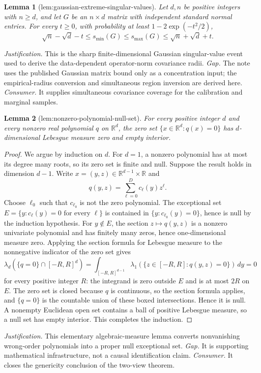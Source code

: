 \documentclass{article}
\newtheorem{lemma}{Lemma}
\begin{document}
\begin{lemma}[lem:gaussian-extreme-singular-values]\label{lem:gaussian-extreme-singular-values}
Let \(d,n\) be positive integers with \(n\ge d\), and let \(G\) be an \(n\times d\) matrix with independent standard normal entries.  For every \(t\ge0\), with probability at least \(1-2\exp(-t^2/2)\),
\[
\sqrt n-\sqrt d-t\le s_{\min}(G)\le s_{\max}(G)\le\sqrt n+\sqrt d+t.
\]
\end{lemma}
\par\smallskip\noindent \textit{Justification.} This is the sharp finite-dimensional Gaussian singular-value event used to derive the data-dependent operator-norm covariance radii. \textit{Gap.} The note uses the published Gaussian matrix bound only as a concentration input; the empirical-radius conversion and simultaneous region inversion are derived here. \textit{Consumer.} It supplies simultaneous covariance coverage for the calibration and marginal samples.

\begin{lemma}[lem:nonzero-polynomial-null-set]\label{lem:nonzero-polynomial-null-set}
For every positive integer \(d\) and every nonzero real polynomial \(q\) on \(\mathbb R^d\), the zero set \(\{x\in\mathbb R^d:q(x)=0\}\) has \(d\)-dimensional Lebesgue measure zero and empty interior.
\end{lemma}
\begin{proof}
We argue by induction on \(d\).  For \(d=1\), a nonzero polynomial has at most its degree many roots, so its zero set is finite and null.  Suppose the result holds in dimension \(d-1\).  Write \(x=(y,z)\in\mathbb R^{d-1}\times\mathbb R\) and
\[
q(y,z)=\sum_{\ell=0}^{D}c_\ell(y)z^\ell.
\]
Choose \(\ell_0\) such that \(c_{\ell_0}\) is not the zero polynomial.  The exceptional set \(E=\{y:c_\ell(y)=0\text{ for every }\ell\}\) is contained in \(\{y:c_{\ell_0}(y)=0\}\), hence is null by the induction hypothesis.  For \(y\notin E\), the section \(z\mapsto q(y,z)\) is a nonzero univariate polynomial and has finitely many zeros, hence one-dimensional measure zero.  Applying the section formula for Lebesgue measure to the nonnegative indicator of the zero set gives
\[
\lambda_d(\{q=0\}\cap[-R,R]^d)
=\int_{[-R,R]^{d-1}}\lambda_1(\{z\in[-R,R]:q(y,z)=0\})\,dy=0
\]
for every positive integer \(R\): the integrand is zero outside \(E\) and is at most \(2R\) on \(E\).  The zero set is closed because \(q\) is continuous, so the section formula applies, and \(\{q=0\}\) is the countable union of these boxed intersections.  Hence it is null.  A nonempty Euclidean open set contains a ball of positive Lebesgue measure, so a null set has empty interior.  This completes the induction.
\end{proof}
\par\smallskip\noindent \textit{Justification.} This elementary algebraic-measure lemma converts nonvanishing wrong-order polynomials into a proper null exceptional set. \textit{Gap.} It is supporting mathematical infrastructure, not a causal identification claim. \textit{Consumer.} It closes the genericity conclusion of the two-view theorem.
\end{document}
